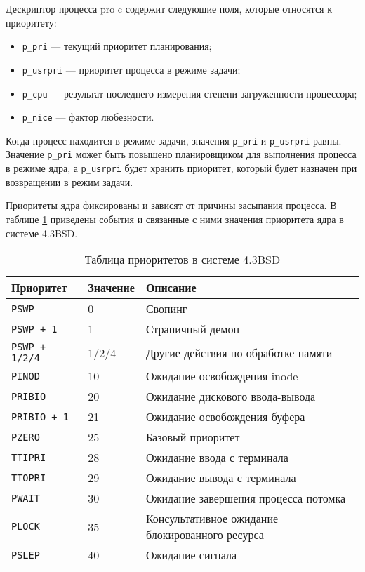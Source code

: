 Дескриптор процесса pro c содержит следующие поля, которые относятся к приоритету:
\begin{itemize}
	\item \texttt{p\_pri} --- текущий приоритет планирования;
	\item \texttt{p\_usrpri} --- приоритет процесса в режиме задачи;
	\item \texttt{p\_cpu} --- результат последнего измерения степени загруженности процессора;
	\item \texttt{p\_nice} --- фактор любезности.
\end{itemize}
Когда процесс находится в режиме задачи, значения \texttt{p\_pri} и \texttt{p\_usrpri} равны. Значение \texttt{p\_pri} может быть повышено планировщиком для выполнения процесса в режиме ядра, а \texttt{p\_usrpri} будет хранить приоритет, который будет назначен при возвращении в режим задачи. 

Приоритеты ядра фиксированы и зависят от причины засыпания процесса. В таблице \ref{bsd} приведены события и связанные с ними значения приоритета ядра в системе 4.3BSD. 

\begin{table}[H]
	\caption{Таблица приоритетов в системе 4.3BSD}
	\begin{center}
		\begin{tabular}{ |l|l|p{}|  }
			\hline
			\textbf{Приоритет} & \textbf{Значение} & \textbf{Описание} \\ \hline
			\texttt{PSWP} & 0 & Свопинг \\
			\texttt{PSWP + 1} & 1 & Страничный демон \\
			\texttt{PSWP + 1/2/4} & 1/2/4 & Другие действия по обработке памяти \\
			\texttt{PINOD} & 10 & Ожидание освобождения inode \\
			\texttt{PRIBIO} & 20 & Ожидание дискового ввода-вывода \\
			\texttt{PRIBIO + 1} & 21 & Ожидание освобождения буфера \\
			\texttt{PZERO} & 25 & Базовый приоритет \\
			\texttt{TTIPRI} & 28 & Ожидание ввода с терминала \\
			\texttt{TTOPRI} & 29 & Ожидание вывода с терминала \\ 
			\texttt{PWAIT} & 30 & Ожидание завершения процесса потомка \\
			\texttt{PLOCK} & 35 & Консультативное ожидание блокированного ресурса \\
			\texttt{PSLEP} & 40 & Ожидание сигнала \\
			\hline
		\end{tabular}
		\label{bsd}
	\end{center}
\end{table}

